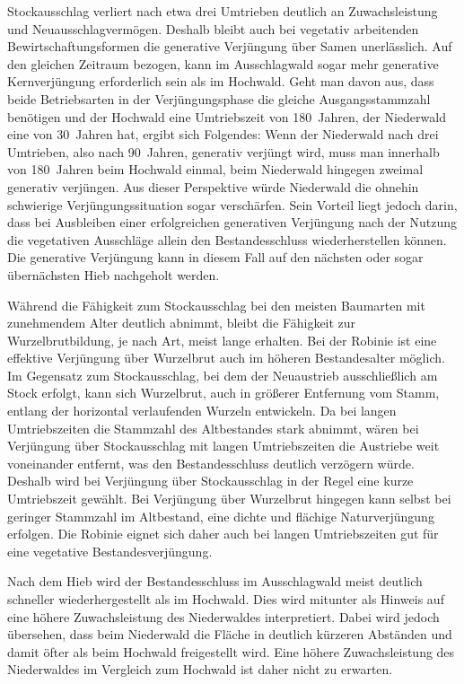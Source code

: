 \documentclass[twocolumn]{scrartcl}
\begin{document}
Stockausschlag verliert nach etwa drei Umtrieben deutlich an Zuwachsleistung und
Neuausschlagvermögen.
Deshalb bleibt auch bei vegetativ arbeitenden Bewirtschaftungsformen
die generative Verjüngung über Samen unerlässlich.
Auf den gleichen Zeitraum bezogen, kann im Ausschlagwald sogar
mehr generative Kernverjüngung erforderlich sein als im Hochwald. Geht man davon
aus, dass beide Betriebsarten in der Verjüngungsphase die gleiche
Ausgangsstammzahl benötigen und der Hochwald eine Umtriebszeit von 180~Jahren,
der Niederwald eine von 30~Jahren hat, ergibt sich Folgendes: Wenn der
Niederwald nach drei Umtrieben, also nach 90~Jahren, generativ verjüngt wird,
muss man innerhalb von 180~Jahren beim Hochwald einmal, beim Niederwald hingegen
zweimal generativ verjüngen.
Aus dieser Perspektive würde Niederwald die ohnehin
schwierige Verjüngungssituation sogar verschärfen.
Sein Vorteil liegt jedoch darin, dass bei Ausbleiben einer
erfolgreichen generativen Verjüngung nach der Nutzung die vegetativen
Ausschläge allein den Bestandesschluss wiederherstellen können. Die
generative Verjüngung kann in diesem Fall auf den nächsten oder sogar
übernächsten Hieb nachgeholt werden.


Während die Fähigkeit zum Stockausschlag bei den meisten Baumarten mit
zunehmendem Alter deutlich abnimmt, bleibt die Fähigkeit zur
Wurzelbrutbildung, je nach Art, meist lange erhalten. Bei der Robinie
ist eine effektive Verjüngung über Wurzelbrut auch im höheren
Bestandesalter möglich. Im Gegensatz zum Stockausschlag, bei dem der
Neuaustrieb ausschließlich am Stock erfolgt, kann sich Wurzelbrut,
auch in größerer Entfernung vom Stamm, entlang der horizontal
verlaufenden Wurzeln entwickeln. Da bei langen Umtriebszeiten die
Stammzahl des Altbestandes stark abnimmt, wären bei Verjüngung über
Stockausschlag mit langen Umtriebszeiten die Austriebe weit
voneinander entfernt, was den Bestandesschluss deutlich verzögern
würde. Deshalb wird bei Verjüngung über Stockausschlag in der Regel
eine kurze Umtriebszeit gewählt. Bei Verjüngung über Wurzelbrut
hingegen kann selbst bei geringer Stammzahl im Altbestand, eine dichte
und flächige Naturverjüngung erfolgen. Die Robinie eignet sich daher
auch bei langen Umtriebszeiten gut für eine vegetative
Bestandesverjüngung.

Nach dem Hieb wird der Bestandesschluss im Ausschlagwald meist deutlich
schneller wiederhergestellt als im Hochwald. Dies wird mitunter als Hinweis auf
eine höhere Zuwachsleistung des Niederwaldes interpretiert. Dabei wird jedoch
übersehen, dass beim Niederwald die Fläche in deutlich kürzeren Abständen und
damit öfter als beim Hochwald freigestellt wird. Eine höhere Zuwachsleistung des
Niederwaldes im Vergleich zum Hochwald ist daher nicht zu erwarten.
\end{document}
